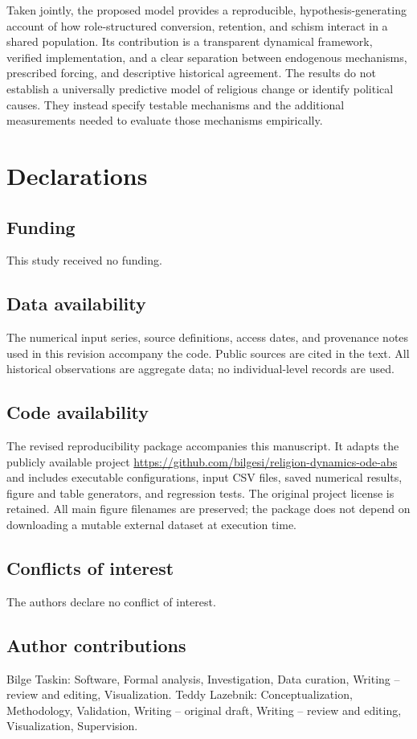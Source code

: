 \documentclass[11pt,a4paper]{article}
\begin{document}
Taken jointly, the proposed model provides a reproducible, hypothesis-generating account of how role-structured conversion, retention, and schism interact in a shared population. Its contribution is a transparent dynamical framework, verified implementation, and a clear separation between endogenous mechanisms, prescribed forcing, and descriptive historical agreement. The results do not establish a universally predictive model of religious change or identify political causes. They instead specify testable mechanisms and the additional measurements needed to evaluate those mechanisms empirically.

\section*{Declarations}
\subsection*{Funding}
This study received no funding.
\subsection*{Data availability}
The numerical input series, source definitions, access dates, and provenance notes used in this revision accompany the code. Public sources are cited in the text. All historical observations are aggregate data; no individual-level records are used.
\subsection*{Code availability}
The revised reproducibility package accompanies this manuscript. It adapts the publicly available project \url{https://github.com/bilgesi/religion-dynamics-ode-abs} \cite{upstream_code} and includes executable configurations, input CSV files, saved numerical results, figure and table generators, and regression tests. The original project license is retained. All main figure filenames are preserved; the package does not depend on downloading a mutable external dataset at execution time.
\subsection*{Conflicts of interest}
The authors declare no conflict of interest.
\subsection*{Author contributions}
Bilge Taskin: Software, Formal analysis, Investigation, Data curation, Writing -- review and editing, Visualization. Teddy Lazebnik: Conceptualization, Methodology, Validation, Writing -- original draft, Writing -- review and editing, Visualization, Supervision.
\end{document}
